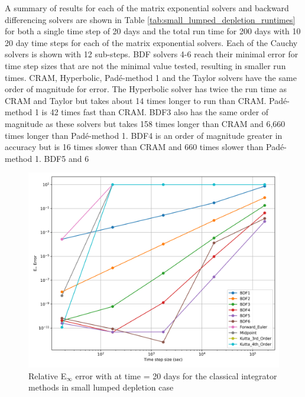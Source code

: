 A summary of results for each of the matrix exponential solvers and backward differencing solvers are shown in Table \ref{tab:small_lumped_depletion_runtimes} for both a single time step of 20 days and the total run time for 200 days with 10 20 day time steps for each of the matrix exponential solvers. Each of the Cauchy solvers is shown with 12 sub-steps. BDF solvers 4-6 reach their minimal error for time step sizes that are not the minimal value tested, resulting in smaller run times. CRAM, Hyperbolic, Pad\'e-method 1 and the Taylor solvers have the same order of magnitude for error. The Hyperbolic solver has twice the run time as CRAM and Taylor but takes about 14 times longer to run than CRAM. Pad\'e-method 1 is 42 times fast than CRAM. BDF3 also has the same order of magnitude as these solvers but takes 158 times longer than CRAM and 6,660 times longer than Pad\'e-method 1. BDF4 is an order of magnitude greater in accuracy but is 16 times slower than CRAM and 660 times slower than Pad\'e-method 1. BDF5 and 6 

\clearpage

\begin{figure}[p]
    \centering
    \includegraphics[width=5in]{images/chapter-5/caseStudies/smallLumpedDepletion/msrSmallLumpedDepletionEinfErrorerrorIntegrators.png}
    \caption{Relative E$_{\infty}$ error with at time = 20 days for the classical integrator methods in small lumped depletion case}
    \label{fig:small_lumped_depletion_Einf_integrators}
\end{figure}

\clearpage

